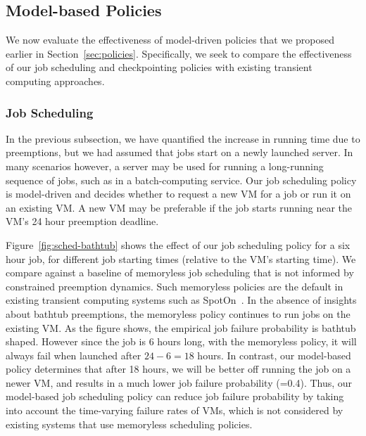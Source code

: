 \subsection{Model-based Policies}
\label{subsec:eval-policy}

We now evaluate the effectiveness of model-driven policies that we proposed earlier in Section~\ref{sec:policies}.
Specifically, we seek to compare the effectiveness of our job scheduling and checkpointing policies with existing transient computing approaches.


\vspace*{\subsecspace}
\subsubsection{Job Scheduling}

In the previous subsection, we have quantified the increase in running time due to preemptions, but we had assumed that jobs start on a newly launched server.
In many scenarios however, a server may be used for running a long-running sequence of jobs, such as in a batch-computing service. 
%
Our job scheduling policy is model-driven and decides whether to request a new VM for a job or run it on an existing VM.
A new VM may be preferable if the job starts running near the VM's 24 hour preemption deadline.

Figure~\ref{fig:sched-bathtub} shows the effect of our job scheduling policy for a six hour job, for different job starting times (relative to the VM's starting time). 
We compare against a baseline of memoryless job scheduling that is not informed by constrained preemption dynamics.
Such memoryless policies are the default in existing transient computing systems such as SpotOn~\cite{spoton}. 
In the absence of insights about bathtub preemptions, the memoryless policy continues to run jobs on the existing VM. 
As the figure shows, the empirical job failure probability is bathtub shaped. 
However since the job is 6 hours long, with the memoryless policy, it will always fail when launched after $24-6=18$ hours.
In contrast, our model-based policy determines that after 18 hours, we will be better off running the job on a newer VM, and results in a much lower job failure probability (=0.4).
Thus, our model-based job scheduling policy can reduce job failure probability by taking into account the time-varying failure rates of VMs, which is not considered by existing systems that use memoryless scheduling policies.

